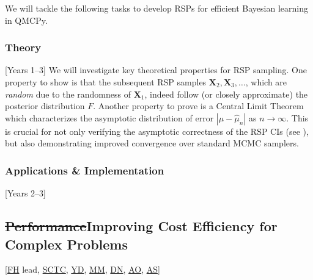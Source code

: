 \documentclass[11pt]{NSFamsart}
\newcommand{\cmtS}[1]{{\color{blue}{(Simon: #1)}}}
\newcommand{\FH}{\hyperlink{FHlink}{FH}\xspace}
\newcommand{\SM}{\hyperlink{SMlink}{SM}\xspace}
\newcommand{\SCTC}{\hyperlink{SCTClink}{SCTC}\xspace}
\newcommand{\AO}{\hyperlink{AOlink}{AO}\xspace}
\newcommand{\MM}{\hyperlink{MMlink}{MM}\xspace}
\newcommand{\YD}{\hyperlink{YDlink}{YD}\xspace}
\newcommand{\AS}{\hyperlink{ASlink}{AS}\xspace}
\newcommand{\DN}{\hyperlink{DNlink}{DN}\xspace}
\newcommand{\bX}{{\boldsymbol{X}}}
\newcommand{\SMNote}[1]{{\color{blue}Simon: #1}}
\begin{document}
We will tackle the following tasks to develop RSPs for efficient Bayesian learning in QMCPy.
\subsubsection{Theory} [Years 1--3]
We will investigate key theoretical properties for RSP sampling. One property to show is that the subsequent RSP samples $\bX_2, \bX_3, \ldots$, which are \textit{random} due to the randomness of $\bX_1$, indeed follow (or closely approximate) the posterior distribution $F$. Another property to prove is a Central Limit Theorem which characterizes the asymptotic distribution of error $|\mu-\hat{\mu}_n|$ as $n \rightarrow \infty$. This is crucial for not only verifying the asymptotic correctness of the RSP CIs (see \cite{rosenthal2017simple}), but also demonstrating improved convergence over standard MCMC samplers.

\subsubsection{Applications \& Implementation} [Years 2--3] 
\cmtS{Discuss preliminary simulation results and ball dropping toy application. Application for turbomachinery application, where we can pull out gradients from our simulators. }





\subsection{\sout{Performance}Improving Cost Efficiency for Complex Problems} [\FH lead, \SCTC, \YD, \MM, \DN, \AO, \AS{}] \label{sec:performance}
\cmtS{ideas on gauging confidence, adaptive algorithms, uncertainty quantification.} \cmtS{structure: Motivation \& preliminary results, Action tasks, Application \& implementation?}
\end{document}
